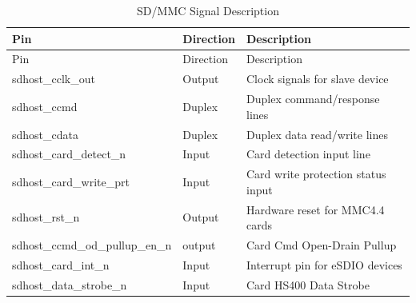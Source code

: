 \begin{longtable}[c]{ |p{5cm}|p{3cm}|p{8cm}| }
\caption{SD/MMC Signal Description} \label{tab:sdhost-signal-description}\\
\hline
\rowcolor{lightgray}
Pin & Direction & Description \\
\hline
\endfirsthead
\hline
\rowcolor{lightgray}
Pin & Direction & Description  \\
\hline
\endhead
\endfoot
sdhost\_cclk\_out & Output & Clock signals for slave device	\\\hline
sdhost\_ccmd & Duplex & Duplex command/response lines  \\\hline
sdhost\_cdata & Duplex & Duplex data read/write lines	\\\hline
sdhost\_card\_detect\_n & Input &  Card detection input line\\\hline
sdhost\_card\_write\_prt & Input & Card write protection status input 	\\\hline
sdhost\_rst\_n & Output & Hardware reset for MMC4.4 cards 	\\\hline
sdhost\_ccmd\_od\_pullup\_en\_n & output & Card Cmd Open-Drain Pullup  	\\\hline
sdhost\_card\_int\_n & Input & Interrupt pin for eSDIO devices 	\\\hline
sdhost\_data\_strobe\_n & Input & Card HS400 Data Strobe 	\\\hline
\end{longtable}